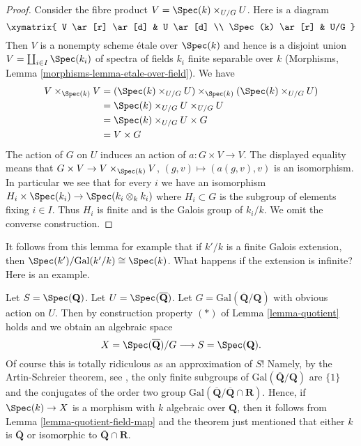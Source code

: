 \begin{proof}
Consider the fibre product $V = \Spec(k) \times_{U/G} U$.
Here is a diagram
$$
\xymatrix{
V \ar[r] \ar[d] & U \ar[d] \\
\Spec(k) \ar[r] & U/G
}
$$
Then $V$ is a nonempty scheme \'etale over $\Spec(k)$ and hence is a
disjoint union $V = \coprod_{i \in I} \Spec(k_i)$
of spectra of fields $k_i$ finite separable over $k$
(Morphisms, Lemma \ref{morphisms-lemma-etale-over-field}).
We have
\begin{align*}
V \times_{\Spec(k)} V
& =
(\Spec(k) \times_{U/G} U) \times_{\Spec(k)}(\Spec(k) \times_{U/G} U) \\
& = 
\Spec(k) \times_{U/G} U \times_{U/G} U \\
& =
\Spec(k) \times_{U/G} U \times G \\
& =
V \times G
\end{align*}
The action of $G$ on $U$ induces an action of $a : G \times V \to V$.
The displayed equality means that
$G \times V \to V \times_{\Spec(k)} V$, $(g, v) \mapsto (a(g, v), v)$
is an isomorphism. In particular we see that for every $i$ we have
an isomorphism $H_i \times \Spec(k_i) \to \Spec(k_i \otimes_k k_i)$
where $H_i \subset G$ is the subgroup of elements fixing $i \in I$.
Thus $H_i$ is finite and is the Galois group of $k_i/k$.
We omit the converse construction.
\end{proof}

\noindent
It follows from this lemma for example that
if $k'/k$ is a finite Galois extension, then
$\Spec(k')/\text{Gal}(k'/k) \cong \Spec(k)$.
What happens if the extension is infinite? Here is an example.

\begin{example}
\label{example-Qbar}
Let $S = \Spec(\mathbf{Q})$.
Let $U = \Spec(\overline{\mathbf{Q}})$.
Let $G = \text{Gal}(\overline{\mathbf{Q}}/\mathbf{Q})$ with obvious
action on $U$. Then by construction property $(*)$ of
Lemma \ref{lemma-quotient} holds and we obtain an algebraic space
$$
X = \Spec(\overline{\mathbf{Q}})/G
\longrightarrow
S = \Spec(\mathbf{Q}).
$$
Of course this is totally ridiculous as an approximation of $S$!
Namely, by the Artin-Schreier theorem,
see \cite[Theorem 17, page 316]{JacobsonIII},
the only finite subgroups of $\text{Gal}(\overline{\mathbf{Q}}/\mathbf{Q})$
are $\{1\}$ and the conjugates of the order two group
$\text{Gal}(\overline{\mathbf{Q}}/\overline{\mathbf{Q}} \cap \mathbf{R})$.
Hence, if
$\Spec(k) \to X$ is a morphism with $k$ algebraic over $\mathbf{Q}$,
then it follows from Lemma \ref{lemma-quotient-field-map} and the theorem
just mentioned that either $k$ is $\overline{\mathbf{Q}}$ or isomorphic to
$\overline{\mathbf{Q}} \cap \mathbf{R}$.
\end{example}

